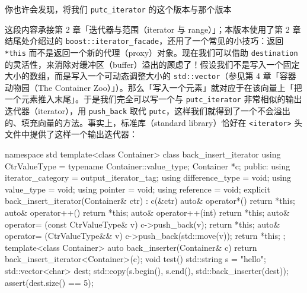 你也许会发现，将我们 \texttt{putc\_\allowbreak{}iterator} 的这个版本与那个版本

这段内容承接第 2 章「迭代器与范围（iterator 与 range）」；本版本使用了第 2 章结尾处介绍过的 \texttt{boost::\allowbreak{}iterator\_\allowbreak{}facade}，还用了一个常见的小技巧：返回 \texttt{*this} 而不是返回一个新的代理（proxy）对象。现在我们可以借助 \texttt{destination} 的灵活性，来消除对缓冲区（buffer）溢出的顾虑了！假设我们不是写入一个固定大小的数组，而是写入一个可动态调整大小的 \texttt{std::\allowbreak{}vector}（参见第 4 章「容器动物园（The Container Zoo）」）。那么「写入一个元素」就对应于在该向量上「把一个元素推入末尾」。于是我们完全可以写一个与 \texttt{putc\_\allowbreak{}iterator} 非常相似的输出迭代器（iterator），用 \texttt{push\_\allowbreak{}back} 取代 \texttt{putc}，这样我们就得到了一个不会溢出的、填充向量的方法。事实上，标准库（standard library）恰好在 \texttt{<iterator>\allowbreak{}} 头文件中提供了这样一个输出迭代器：

\begin{codebox}[cpp]
    namespace std {
      template<class Container>
      class back_insert_iterator {
        using CtrValueType = typename Container::value_type;
        Container *c;
      public:
        using iterator_category = output_iterator_tag;
        using difference_type = void;
        using value_type = void;
        using pointer = void;
        using reference = void;
        explicit back_insert_iterator(Container& ctr) : c(&ctr) {}
        auto& operator*() { return *this; }
        auto& operator++() { return *this; }
        auto& operator++(int) { return *this; }
        auto& operator= (const CtrValueType& v) {
            c->push_back(v);
            return *this;
        }
        auto& operator= (CtrValueType&& v) {
            c->push_back(std::move(v));
            return *this;
        }
      };
      template<class Container>
      auto back_inserter(Container& c)
      {
         return back_insert_iterator<Container>(c);
      }
    }
    void test()
    {
      std::string s = "hello";
      std::vector<char> dest;
      std::copy(s.begin(), s.end(), std::back_inserter(dest));
      assert(dest.size() == 5);
    }
\end{codebox}

